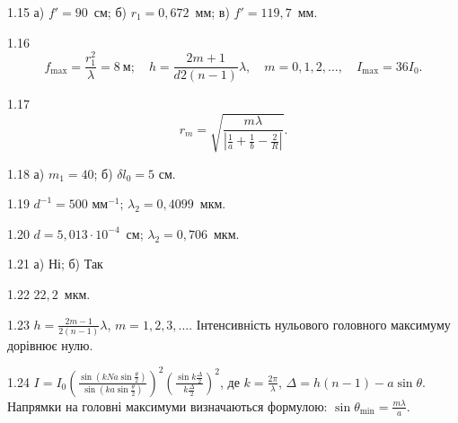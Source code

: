 \begin{Solution}{1.{15}}
        а) $ f' = 90 $~см; б) $ r_1 = 0,672 $~мм; в) $ f' =119,7 $~мм.
    
\end{Solution}
\begin{Solution}{1.{16}}
        \begin{equation*}
            f_{\max} = \frac{r_1^2}{\lambda} = 8\ \text{м}; \quad h = \frac{2m+1}{d2(n - 1)}\lambda, \quad m = 0, 1, 2, \ldots, \quad I_{\max} = 36 I_0.
        \end{equation*}
    
\end{Solution}
\begin{Solution}{1.{17}}
        \begin{equation*}
            r_m = \sqrt{\frac{m\lambda}{\left|\frac1a + \frac1b - \frac2R \right|}}.
        \end{equation*}
    
\end{Solution}
\begin{Solution}{1.{18}}
        а) $ m_1 = 40 $; б) $ \delta l_0 = 5 $ см.
    
\end{Solution}
\begin{Solution}{1.{19}}
        $d^{-1} = 500$ мм$^{-1}$; $ \lambda_2 = 0,4099 $~мкм.
    
\end{Solution}
\begin{Solution}{1.{20}}
         $ d = 5,013\cdot10^{-4} $~см; $ \lambda_2 = 0,706 $~мкм.
    
\end{Solution}
\begin{Solution}{1.{21}}
        а) Ні; б) Так
    
\end{Solution}
\begin{Solution}{1.{22}}
       $ 22,2 $~мкм.
    
\end{Solution}
\begin{Solution}{1.{23}}
        $ h = \frac{2m-1}{2(n-1)}\lambda$, $m = 1, 2, 3, \ldots$. Інтенсивність нульового головного максимуму
        дорівнює нулю.
    
\end{Solution}
\begin{Solution}{1.{24}}
        $I = I_0\left( \frac{\sin \left( kNa\sin\frac\theta2\right) }{\sin \left( ka\sin\frac\theta2\right) } \right)^2
        \left( \frac{\sin k\frac\Delta2}{k\frac\Delta2} \right)^2 $, де $k = \frac{2\pi}{\lambda}$, $\Delta = h (n-1) - a\sin\theta$. Напрямки на головні максимуми визначаються формулою: $\sin\theta_{\min} = \frac{m\lambda}{a}$.
    
\end{Solution}
